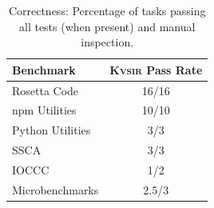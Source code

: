 \documentclass[noacm,sigplan,review]{acmart}
\newcommand{\sys}{{\scshape Kv{\textalpha}sir}\xspace}
\begin{document}
\begin{table}[h]
  \centering
  \caption{Correctness: Percentage of tasks passing all tests (when present) and manual inspection.}
  \begin{tabular}{lc}
    \toprule
    Benchmark & \sys Pass Rate \\ 
    \midrule
    Rosetta Code & 16/16  \\
    npm Utilities & 10/10 \\
    Python Utilities & 3/3\\
    SSCA & 3/3  \\
    IOCCC & 1/2 \\
    Microbenchmarks & 2.5/3  \\
    \bottomrule
  \end{tabular}
\end{table}
\end{document}
